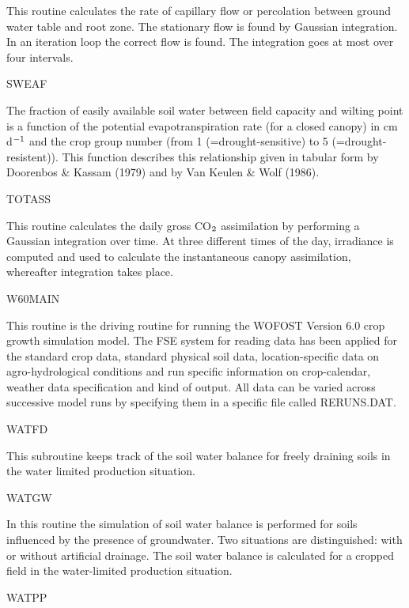 \begin{indenting}{2.54cm}
This routine calculates the rate of capillary flow or percolation between
ground water table and root zone. The stationary flow is found by Gaussian
integration. In an iteration loop the correct flow is found. The integration
goes at most over four intervals.
\end{indenting}
SWEAF
\testlastline

\begin{indenting}{2.54cm}
The fraction of easily available soil water between field capacity and
wilting point is a function of the potential evapotranspiration rate (for a
closed canopy) in cm d$^{{\rm -1}}$ and the crop group number (from 1 {\nobreak}(=drought-sensitive) to 5 (=drought-resistent)). This function describes this relation\-ship given in tabular form by Doorenbos \& Kassam (1979) and by Van
Keulen \& Wolf (1986).
\end{indenting}
TOTASS
\testlastline

\begin{indenting}{2.54cm}
This routine calculates the daily gross CO$_{{\rm 2}}$ assimilation by performing a
Gaussian integration over time. At three different times of the day, irra\-diance is computed and used to calculate the instantaneous canopy assimila\-tion, whereafter integration takes place. 
\end{indenting}
W60MAIN
\testlastline

\begin{indenting}{2.54cm}
This routine is the driving routine for running the WOFOST Version 6.0
crop growth simulation model. The FSE system for reading data has been
applied for the standard crop data, standard physical soil data, location-specific data on agro-hydrological conditions and run specific information
on crop-calendar, weather data specification and kind of output. All data
can be varied across successive model runs by specify\-ing them in a specific
file called RERUNS.DAT.
\end{indenting}
WATFD
\testlastline

\begin{indenting}{2.54cm}
This subroutine keeps track of the soil water balance for freely draining
soils in the water limited production situation.
\end{indenting}
WATGW
\testlastline

\begin{indenting}{2.54cm}
In this routine the simulation of soil water balance is performed for soils
influenced by the presence of groundwater. Two situations are distin\-guished: with or without artificial drainage. The soil water balance is
calculated for a cropped field in the water-limited production situa\-tion.
\end{indenting}
WATPP
\testlastline

